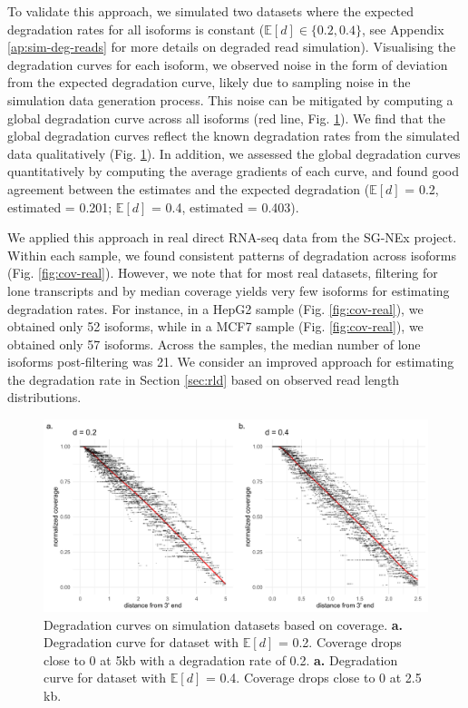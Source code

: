 To validate this approach, we simulated two datasets where the expected degradation rates for all isoforms is constant ($\mathbb{E}[d]\in\{0.2,0.4\}$, see Appendix \ref{ap:sim-deg-reads} for more details on degraded read simulation). Visualising the degradation curves for each isoform, we observed noise in the form of deviation from the expected degradation curve, likely due to sampling noise in the simulation data generation process. This noise can be mitigated by computing a global degradation curve across all isoforms (red line, Fig. \ref{fig:cov-sim}). We find that the global degradation curves reflect the known degradation rates from the simulated data qualitatively (Fig. \ref{fig:cov-sim}). In addition, we assessed the global degradation curves quantitatively by computing the average gradients of each curve, and found good agreement between the estimates and the expected degradation ($\mathbb{E}[d]$ = 0.2, estimated = 0.201; $\mathbb{E}[d]$ = 0.4, estimated = 0.403).

We applied this approach in real direct RNA-seq data from the SG-NEx project. Within each sample, we found consistent patterns of degradation across isoforms (Fig. \ref{fig:cov-real}). However, we note that for most real datasets, filtering for lone transcripts and by median coverage yields very few isoforms for estimating degradation rates. For instance, in a HepG2 sample (Fig. \ref{fig:cov-real}), we obtained only 52 isoforms, while in a MCF7 sample (Fig. \ref{fig:cov-real}), we obtained only 57 isoforms. Across the samples, the median number of lone isoforms post-filtering was 21. We consider an improved approach for estimating the degradation rate in Section \ref{sec:rld} based on observed read length distributions. 

\begin{figure}[H]
    \centering
    \includegraphics[width=\textwidth]{figures/sec-2-cov-sim.png}
    \caption[Degradation curves on simulation datasets based on coverage]{Degradation curves on simulation datasets based on coverage. \textbf{a.} Degradation curve for dataset with $\mathbb{E}[d]$ = 0.2. Coverage drops close to 0 at 5kb with a degradation rate of 0.2. \textbf{a.} Degradation curve for dataset with $\mathbb{E}[d]$ = 0.4. Coverage drops close to 0 at 2.5 kb.}
    \label{fig:cov-sim}
\end{figure}

